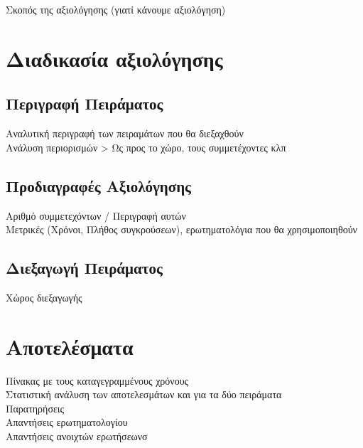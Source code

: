 
Σκοπός της αξιολόγησης (γιατί κάνουμε αξιολόγηση)


\section{Διαδικασία αξιολόγησης}

\subsection{Περιγραφή Πειράματος}
Αναλυτική περιγραφή των πειραμάτων που θα διεξαχθούν\\
Ανάλυση περιορισμών > Ως προς το χώρο, τους συμμετέχοντες κλπ

\subsection{Προδιαγραφές Αξιολόγησης}
Αριθμό συμμετεχόντων / Περιγραφή αυτών\\
Μετρικές (Χρόνοι, Πλήθος συγκρούσεων), ερωτηματολόγια που θα χρησιμοποιηθούν

\subsection{Διεξαγωγή Πειράματος}
Χώρος διεξαγωγής

\section{Αποτελέσματα}
Πίνακας με τους καταγεγραμμένους χρόνους\\
Στατιστική ανάλυση των αποτελεσμάτων και για τα δύο πειράματα\\
Παρατηρήσεις\\
Απαντήσεις ερωτηματολογίου\\
Απαντήσεις ανοιχτών ερωτήσεωνσ